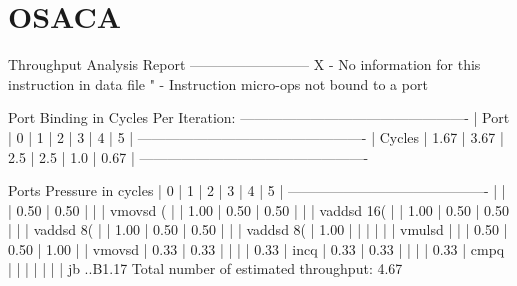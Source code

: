 \section{OSACA}

\begin{Example}
    Throughput Analysis Report
    --------------------------
    X - No information for this instruction in data file
    " - Instruction micro-ops not bound to a port
    
    Port Binding in Cycles Per Iteration:
    -------------------------------------------------
    | Port   |   0  |   1  |  2  |  3  |  4  |   5  |
    -------------------------------------------------
    | Cycles | 1.67 | 3.67 | 2.5 | 2.5 | 1.0 | 0.67 |
    -------------------------------------------------
    
    Ports Pressure in cycles
    |   0  |   1  |   2  |   3  |   4  |   5  |
    -------------------------------------------
    |      |      | 0.50 | 0.50 |      |      | vmovsd  (%
    |      | 1.00 | 0.50 | 0.50 |      |      | vaddsd  16(%
    |      | 1.00 | 0.50 | 0.50 |      |      | vaddsd  8(%
    |      | 1.00 | 0.50 | 0.50 |      |      | vaddsd  8(%
    | 1.00 |      |      |      |      |      | vmulsd  %
    |      |      | 0.50 | 0.50 | 1.00 |      | vmovsd  %
    | 0.33 | 0.33 |      |      |      | 0.33 | incq    %
    | 0.33 | 0.33 |      |      |      | 0.33 | cmpq    %
    |      |      |      |      |      |      | jb      ..B1.17
    Total number of estimated throughput: 4.67
\end{Example}

















